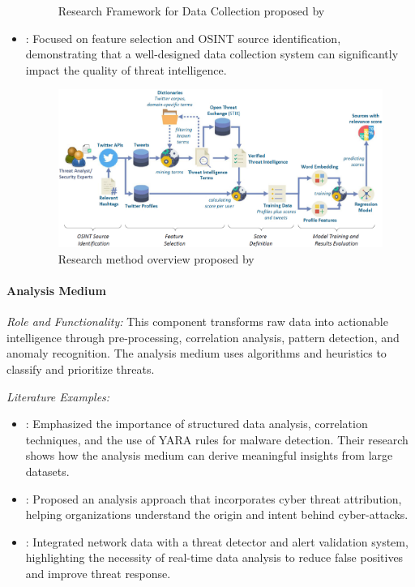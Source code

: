 \documentclass[a4paper,twoside,12pt]{report}
\begin{document}
\begin{itemize}
\begin{figure}[ht]
        \caption{Research Framework for Data Collection proposed by \citep{ryandy2020xt}}
        \label{fig:thing1}
    \end{figure}
    \item \citep{tundis2022feature}: Focused on feature selection and OSINT source identification, demonstrating that a well-designed data collection system can significantly impact the quality of threat intelligence.
    \begin{figure}[ht]
        \centering
        \includegraphics[width=1.0\linewidth]{images/research-method-overview.png}  %
        \caption{Research method overview proposed by \citep{tundis2022feature}}
        \label{fig:thing1}
    \end{figure}
\end{itemize}


\paragraph{Analysis Medium}
\textit{Role and Functionality:} This component transforms raw data into actionable intelligence through pre-processing, correlation analysis, pattern detection, and anomaly recognition. The analysis medium uses algorithms and heuristics to classify and prioritize threats.

\textit{Literature Examples:}
\begin{itemize}
    \item \citep{kim2016know}: Emphasized the importance of structured data analysis, correlation techniques, and the use of YARA rules for malware detection. Their research shows how the analysis medium can derive meaningful insights from large datasets.
    \item \citep{noor2019machine}: Proposed an analysis approach that incorporates cyber threat attribution, helping organizations understand the origin and intent behind cyber-attacks.
    \item \citep{islam2022smartvalidator}: Integrated network data with a threat detector and alert validation system, highlighting the necessity of real-time data analysis to reduce false positives and improve threat response.
\end{itemize}
\end{document}
